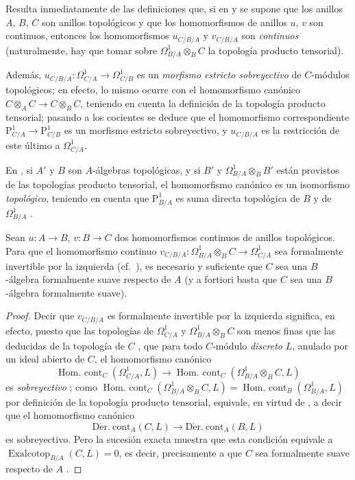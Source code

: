 \begin{env}[20.7.1]
\label{0.20.7.1-fr}
Resulta inmediatamente de las definiciones que, si en  y
 se supone que los anillos $A$, $B$, $C$ son anillos
topológicos y que los homomorfismos de anillos $u$, $v$ son continuos, entonces los
homomorfismos $u_{C/B/A}$ y $v_{C/B/A}$ son \emph{continuos} (naturalmente,
hay que tomar sobre $\Omega^1_{B/A}\otimes_B C$ la topología producto
tensorial).

Además, $u_{C/B/A}:\Omega^1_{C/A}\to\Omega^1_{C/B}$ es un
\emph{morfismo estricto sobreyectivo} de $C$-módulos topológicos; en efecto, lo
mismo ocurre con el homomorfismo canónico $C\otimes_A C\to C\otimes_B C$, teniendo
en cuenta la definición de la topología producto tensorial; pasando a los
cocientes se deduce que el homomorfismo correspondiente
$\mathrm{P}^1_{C/A}\to\mathrm{P}^1_{C/B}$ es un morfismo estricto sobreyectivo,
y $u_{C/B/A}$ es la restricción de este último a $\Omega^1_{C/A}$.

En , si $A'$ y $B$ son $A$-álgebras topológicas,
y si $B'$ y $\Omega^1_{B/A}\otimes_B B'$ están provistos de las topologías producto
tensorial, el homomorfismo canónico  es un isomorfismo
\emph{topológico}, teniendo en cuenta que $\mathrm{P}^1_{B/A}$ es suma directa
topológica de $B$ y de $\Omega^1_{B/A}$ .
\end{env}

\begin{proposition}[20.7.2]
\label{0.20.7.2-fr}
Sean $u:A\to B$, $v:B\to C$ dos homomorfismos continuos de anillos
topológicos. Para que el homomorfismo continuo
$v_{C/B/A}:\Omega^1_{B/A}\otimes_B C\to\Omega^1_{C/A}$ sea formalmente
invertible por la izquierda \textup{(cf.\ )}, es necesario y suficiente que $C$
sea una $B$-álgebra formalmente suave respecto de $A$
 \textup{(y} a fortiori \textup{basta que $C$ sea una
$B$-álgebra formalmente suave)}.
\end{proposition}

\begin{proof}
Decir que $v_{C/B/A}$ es formalmente invertible por la izquierda significa, en efecto,
puesto que las topologías de $\Omega^1_{C/A}$ y $\Omega^1_{B/A}\otimes_B C$
son menos finas que las deducidas de la topología de $C$
, que para todo $C$-módulo \emph{discreto} $L$, anulado por un
ideal abierto de $C$, el homomorfismo canónico
\[
  \operatorname{Hom.\ cont}_C(\Omega^1_{C/A},L)\to
  \operatorname{Hom.\ cont}_C(\Omega^1_{B/A}\otimes_B C,L)
\]
es \emph{sobreyectivo} ; como
$\operatorname{Hom.\ cont}_C(\Omega^1_{B/A}\otimes_B C,L)=
\operatorname{Hom.\ cont}_B(\Omega^1_{B/A},L)$ por definición de la topología
producto tensorial, equivale, en virtud de , a decir
que el homomorfismo canónico
\[
  \operatorname{D\acute{e}r.\ cont}_A(C,L)\to
  \operatorname{D\acute{e}r.\ cont}_A(B,L)
\]
es sobreyectivo. Pero la sucesión exacta  muestra que esta
condición equivale a $\operatorname{Exalcotop}_{B/A}(C,L)=0$, es decir,
precisamente a que $C$ sea formalmente suave respecto de $A$
.
\end{proof}

